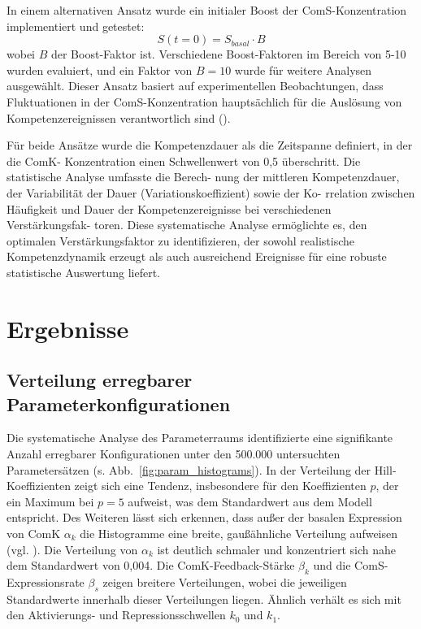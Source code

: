 \documentclass[11pt]{article}
\begin{document}
In einem alternativen Ansatz wurde ein initialer Boost der ComS-Konzentration implementiert und getestet:
\begin{equation}
S(t=0) = S_{basal} \cdot B
\end{equation}
wobei $B$ der Boost-Faktor ist. Verschiedene Boost-Faktoren im Bereich von 5-10 wurden evaluiert, und ein Faktor von $B = 10$ wurde für weitere Analysen ausgewählt. Dieser Ansatz basiert auf experimentellen Beobachtungen, dass Fluktuationen in der ComS-Konzentration hauptsächlich für die Auslösung von Kompetenzereignissen verantwortlich sind (\cite{maamar2007, suel2006}). 

Für beide Ansätze wurde die Kompetenzdauer als die Zeitspanne definiert, in der die ComK-
Konzentration einen Schwellenwert von 0,5 überschritt. Die statistische Analyse umfasste die Berech-
nung der mittleren Kompetenzdauer, der Variabilität der Dauer (Variationskoeffizient) sowie der Ko-
rrelation zwischen Häufigkeit und Dauer der Kompetenzereignisse bei verschiedenen Verstärkungsfak-
toren. Diese systematische Analyse ermöglichte es, den optimalen Verstärkungsfaktor zu identifizieren,
der sowohl realistische Kompetenzdynamik erzeugt als auch ausreichend Ereignisse für eine robuste
statistische Auswertung liefert.

\section{Ergebnisse}\label{section-results}

\subsection{Verteilung erregbarer Parameterkonfigurationen}

Die systematische Analyse des Parameterraums identifizierte eine signifikante Anzahl erregbarer Konfigurationen unter den 500.000 untersuchten Parametersätzen (s. Abb.~\ref{fig:param_histograms}). In der Verteilung der Hill-Koeffizienten zeigt sich eine Tendenz, insbesondere für den Koeffizienten $p$, der ein Maximum bei $p=5$ aufweist, was dem Standardwert aus dem Modell entspricht. Des Weiteren lässt sich erkennen, dass außer der basalen Expression von ComK $\alpha_k$ die Histogramme eine breite, gaußähnliche Verteilung aufweisen (vgl. \cite{schultz2007}). Die Verteilung von $\alpha_k$ ist deutlich schmaler und konzentriert sich nahe dem Standardwert von 0,004. Die ComK-Feedback-Stärke $\beta_k$ und die ComS-Expressionsrate $\beta_s$ zeigen breitere Verteilungen, wobei die jeweiligen Standardwerte innerhalb dieser Verteilungen liegen. Ähnlich verhält es sich mit den Aktivierungs- und Repressionsschwellen $k_0$ und $k_1$.
\end{document}
